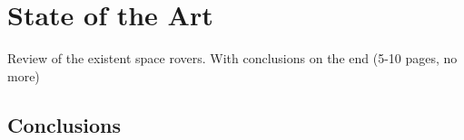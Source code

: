 \chapter{State of the Art} \label{state-of-the-art}

Review of the existent space rovers. With conclusions on the end (5-10 pages,
no more)

\section{Conclusions}